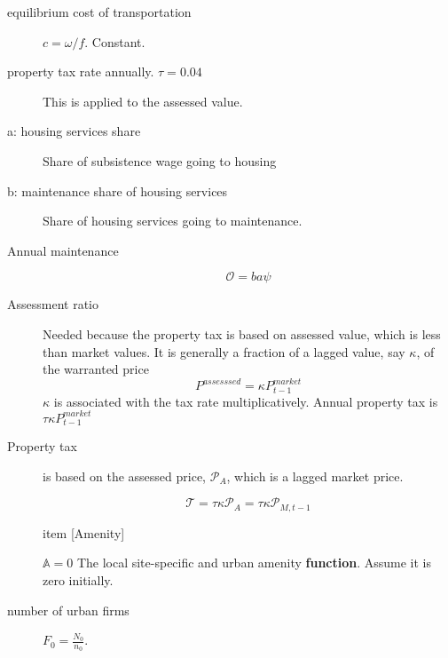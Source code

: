 \begin{description}
\item [equilibrium cost of transportation] $c = \omega/f$. Constant.
\item [property tax rate annually. $\tau=0.04$] This is applied to the assessed value.

\item[a: housing services share] Share of subsistence wage going to housing 




\item[b: maintenance share  of housing services ] Share of housing services going to maintenance.

\item [Annual maintenance]
\[\mathcal{O}=   ba\psi \]

\item[Assessment ratio] 
Needed because the property tax is based on assessed value, which is less than market values. It is generally a fraction of a lagged value, say $\kappa$,  of the warranted price
\[P^{assesssed}=  \kappa P_{t-1}^{market}\]
$\kappa$ is associated with the tax rate multiplicatively. Annual property tax is $\tau\kappa P_{t-1}^{market}$

\item [Property tax] is based on the assessed price, $\mathcal{P}_{A}$, which is a lagged market price.

\[\mathcal{T} = \tau\kappa  \mathcal{P}_{A} =  \tau\kappa \mathcal{P}_{M, t-1} \]



item [Amenity]

$\mathbb{A}=0$
The local site-specific and urban amenity \textbf{function}. %
 Assume it is zero initially.




\item[number of urban firms]  $F_0=\frac{N_0}{n_0}$. %


\end{description}
